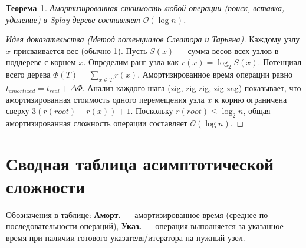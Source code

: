 \documentclass[12pt,a4paper]{article}
\newtheorem{theorem}{Теорема}
\begin{document}
\begin{theorem}
Амортизированная стоимость любой операции (поиск, вставка, удаление) в Splay-дереве составляет $\mathcal{O}(\log n)$.
\end{theorem}
\begin{proof}[Идея доказательства (Метод потенциалов Слеатора и Тарьяна)]
Каждому узлу $x$ присваивается вес (обычно 1). Пусть $S(x)$ — сумма весов всех узлов в поддереве с корнем $x$. Определим ранг узла как $r(x) = \log_2 S(x)$. Потенциал всего дерева $\Phi(T) = \sum_{x \in T} r(x)$.
Амортизированное время операции равно $t_{amortized} = t_{real} + \Delta \Phi$.
Анализ каждого шага (zig, zig-zig, zig-zag) показывает, что амортизированная стоимость одного перемещения узла $x$ к корню ограничена сверху $3(r(root) - r(x)) + 1$. Поскольку $r(root) \le \log_2 n$, общая амортизированная сложность операции составляет $\mathcal{O}(\log n)$.
\end{proof}

\section{Сводная таблица асимптотической сложности}

Обозначения в таблице: \textbf{Аморт.} — амортизированное время (среднее по последовательности операций), \textbf{Указ.} — операция выполняется за указанное время при наличии готового указателя/итератора на нужный узел.
\end{document}
